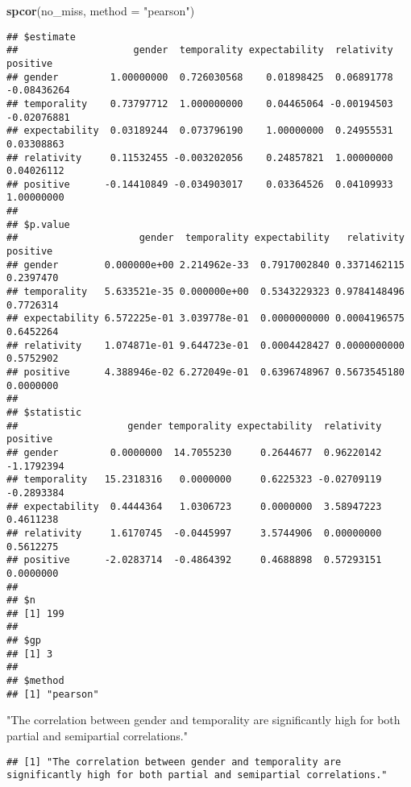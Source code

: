 \documentclass[
]{article}
\newenvironment{Shaded}{\begin{snugshade}}{\end{snugshade}}
\newcommand{\DataTypeTok}[1]{\textcolor[rgb]{0.13,0.29,0.53}{#1}}
\newcommand{\KeywordTok}[1]{\textcolor[rgb]{0.13,0.29,0.53}{\textbf{#1}}}
\newcommand{\NormalTok}[1]{#1}
\newcommand{\StringTok}[1]{\textcolor[rgb]{0.31,0.60,0.02}{#1}}
\begin{document}
\begin{Shaded}
\begin{Highlighting}[]
\KeywordTok{spcor}\NormalTok{(no_miss, }\DataTypeTok{method =} \StringTok{"pearson"}\NormalTok{)}
\end{Highlighting}
\end{Shaded}

\begin{verbatim}
## $estimate
##                    gender  temporality expectability  relativity    positive
## gender         1.00000000  0.726030568    0.01898425  0.06891778 -0.08436264
## temporality    0.73797712  1.000000000    0.04465064 -0.00194503 -0.02076881
## expectability  0.03189244  0.073796190    1.00000000  0.24955531  0.03308863
## relativity     0.11532455 -0.003202056    0.24857821  1.00000000  0.04026112
## positive      -0.14410849 -0.034903017    0.03364526  0.04109933  1.00000000
## 
## $p.value
##                     gender  temporality expectability   relativity  positive
## gender        0.000000e+00 2.214962e-33  0.7917002840 0.3371462115 0.2397470
## temporality   5.633521e-35 0.000000e+00  0.5343229323 0.9784148496 0.7726314
## expectability 6.572225e-01 3.039778e-01  0.0000000000 0.0004196575 0.6452264
## relativity    1.074871e-01 9.644723e-01  0.0004428427 0.0000000000 0.5752902
## positive      4.388946e-02 6.272049e-01  0.6396748967 0.5673545180 0.0000000
## 
## $statistic
##                   gender temporality expectability  relativity   positive
## gender         0.0000000  14.7055230     0.2644677  0.96220142 -1.1792394
## temporality   15.2318316   0.0000000     0.6225323 -0.02709119 -0.2893384
## expectability  0.4444364   1.0306723     0.0000000  3.58947223  0.4611238
## relativity     1.6170745  -0.0445997     3.5744906  0.00000000  0.5612275
## positive      -2.0283714  -0.4864392     0.4688898  0.57293151  0.0000000
## 
## $n
## [1] 199
## 
## $gp
## [1] 3
## 
## $method
## [1] "pearson"
\end{verbatim}

\begin{Shaded}
\begin{Highlighting}[]
\StringTok{"The correlation between gender and temporality are significantly high for both partial and semipartial correlations."}
\end{Highlighting}
\end{Shaded}

\begin{verbatim}
## [1] "The correlation between gender and temporality are significantly high for both partial and semipartial correlations."
\end{verbatim}
\end{document}
